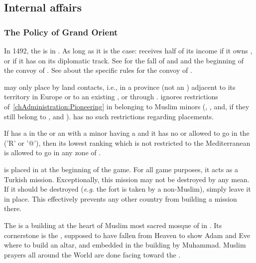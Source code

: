 \subsection{Internal affairs}
\subsubsection{The Policy of Grand Orient}
 In 1492, the  is in
. As long as it is the case:
\bparag \TUR receives half of its income if it owns , or if
it has  on its diplomatic track.
\bparag See  for the fall of  and
 and the beginning of the convoy of .
\bparag See  about the specific rules for the
convoy of .

 \TUR may only place \COL by land contacts,
i.e., in a province (not an \Area) adjacent to its territory in Europe
or to an existing \COL, or through .
\bparag \TUR ignores restrictions of~\ref{chAdministration:Pioneering}
in \Area belonging to Muslim minors (\granderegionAden,
\granderegionOman, \granderegionSoudan and, if they still belong to
\paysGujerat, \granderegionGujarat and \granderegionMalacca).
\bparag \TUR has no such restrictions regarding \TP placements.

\aparag If \TUR has a \TP in the \ROTW or an \dipAT with a minor
having a \TP and it has no \LeaderA or \LeaderE allowed to go in the
\ROTW ('R' or '@'), then its lowest ranking \LeaderA which is not
restricted to the Mediterranean is allowed to go in any zone of
.

\bparag {} is placed in  at the
beginning of the game.
\bparag For all game purposes, it acts as a Turkish mission.
\bparag Exceptionally, this mission may not be destroyed by any
mean. If it should be destroyed (\emph{e.g.} the fort is taken by a
non-Muslim), simply leave it in place. This effectively prevents any
other country from building a mission there.

\begin{histoire}
  The \constructionKaaba is a building at the heart of Muslim most
  sacred mosque of  in \villeMecca. Its
  cornerstone is the , supposed to have fallen from
  Heaven to show Adam and Eve where to build an altar, and embedded in
  the building by Muhammad. Muslim prayers all around the World are
  done facing toward the \constructionKaaba.
\end{histoire}

